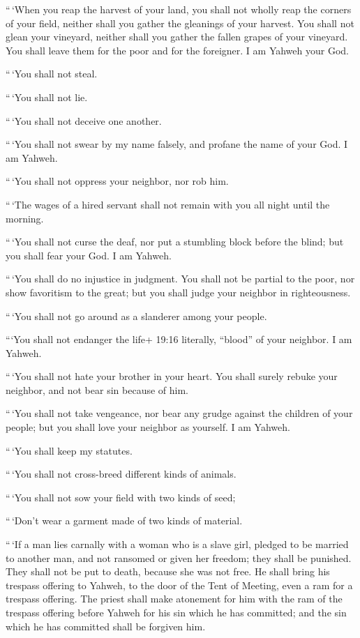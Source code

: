  ``\,`When you reap the harvest of your land, you shall not
wholly reap the corners of your field, neither shall you gather the
gleanings of your harvest.  You shall not glean your
vineyard, neither shall you gather the fallen grapes of your vineyard.
You shall leave them for the poor and for the foreigner. I am Yahweh
your God.

 ``\,`You shall not steal.

``\,`You shall not lie.

``\,`You shall not deceive one another.

 ``\,`You shall not swear by my name falsely, and profane
the name of your God. I am Yahweh.

 ``\,`You shall not oppress your neighbor, nor rob him.

``\,`The wages of a hired servant shall not remain with you all night
until the morning.

 ``\,`You shall not curse the deaf, nor put a stumbling
block before the blind; but you shall fear your God. I am Yahweh.

 ``\,`You shall do no injustice in judgment. You shall not
be partial to the poor, nor show favoritism to the great; but you shall
judge your neighbor in righteousness.

 ``\,`You shall not go around as a slanderer among your
people.

```You shall not endanger the life+ 19:16 literally, ``blood'' of your
neighbor. I am Yahweh.

 ``\,`You shall not hate your brother in your heart. You
shall surely rebuke your neighbor, and not bear sin because of him.

 ``\,`You shall not take vengeance, nor bear any grudge
against the children of your people; but you shall love your neighbor as
yourself. I am Yahweh.

 ``\,`You shall keep my statutes.

``\,`You shall not cross-breed different kinds of animals.

``\,`You shall not sow your field with two kinds of seed;

``\,`Don't wear a garment made of two kinds of material.

 ``\,`If a man lies carnally with a woman who is a slave
girl, pledged to be married to another man, and not ransomed or given
her freedom; they shall be punished. They shall not be put to death,
because she was not free.  He shall bring his trespass
offering to Yahweh, to the door of the Tent of Meeting, even a ram for a
trespass offering.  The priest shall make atonement for him
with the ram of the trespass offering before Yahweh for his sin which he
has committed; and the sin which he has committed shall be forgiven him.

